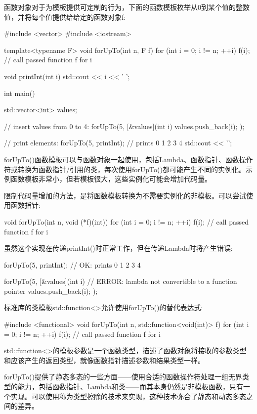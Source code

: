 
函数对象对于为模板提供可定制的行为，下面的函数模板枚举从0到某个值的整数值，并将每个值提供给给定的函数对象f:

\begin{cpp}
#include <vector>
#include <iostream>

template<typename F>
void forUpTo(int n, F f)
{
	for (int i = 0; i != n; ++i)
	{
		f(i); // call passed function f for i
	}
}

void printInt(int i)
{
	std::cout << i << ’ ’;
}

int main()
{
	std::vector<int> values;
	
	// insert values from 0 to 4:
	forUpTo(5,
	[&values](int i) {
		values.push_back(i);
	});

	// print elements:
	forUpTo(5,
			printInt); // prints 0 1 2 3 4
	std::cout << ’\n’;
}
\end{cpp}

forUpTo()函数模板可以与函数对象一起使用，包括Lambda、函数指针、函数操作符或转换为函数指针/引用的类，每次使用forUpTo()都可能产生不同的实例化。示例函数模板非常小，但若模板很大，这些实例化可能会增加代码量。

限制代码量增加的方法，是将函数模板转换为不需要实例化的非模板。可以尝试使用函数指针:

\begin{cpp}
void forUpTo(int n, void (*f)(int))
{
	for (int i = 0; i != n; ++i)
	{
		f(i); // call passed function f for i
	}
}
\end{cpp}

虽然这个实现在传递printInt()时正常工作，但在传递Lambda时将产生错误:

\begin{cpp}
forUpTo(5,
printInt); // OK: prints 0 1 2 3 4

forUpTo(5,
		[&values](int i) { // ERROR: lambda not convertible to a function pointer
			values.push_back(i);
		});
\end{cpp}

标准库的类模板std::function<>允许使用forUpTo()的替代表达式:

\begin{cpp}
#include <functional>
void forUpTo(int n, std::function<void(int)> f)
{
	for (int i = 0; i != n; ++i)
	{
		f(i); // call passed function f for i
	}
}
\end{cpp}

std::function<>的模板参数是一个函数类型，描述了函数对象将接收的参数类型和应该产生的返回类型，就像函数指针描述参数和结果类型一样。

forUpTo()提供了静态多态的一些方面——使用合适的函数操作符处理一组无界类型的能力，包括函数指针、Lambda和类——而其本身仍然是非模板函数，只有一个实现。可以使用称为类型擦除的技术来实现，这种技术弥合了静态和动态多态之间的差异。






























